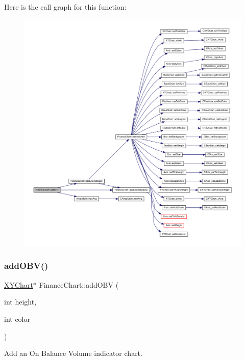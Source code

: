Here is the call graph for this function\+:
\nopagebreak
\begin{figure}[H]
\begin{center}
\leavevmode
\includegraphics[width=350pt]{class_finance_chart_a388881982244585b53d8a318ad4e6254_cgraph}
\end{center}
\end{figure}
\mbox{\label{class_finance_chart_a68954d093f52671623132c5fb35c261b}} 
\subsubsection{\texorpdfstring{add\+O\+B\+V()}{addOBV()}}
{\footnotesize\ttfamily \hyperlink{class_x_y_chart}{X\+Y\+Chart}$\ast$ Finance\+Chart\+::add\+O\+BV (\begin{DoxyParamCaption}\item[{int}]{height,  }\item[{int}]{color }\end{DoxyParamCaption})\hspace{0.3cm}{\ttfamily [inline]}}



Add an On Balance Volume indicator chart. 


